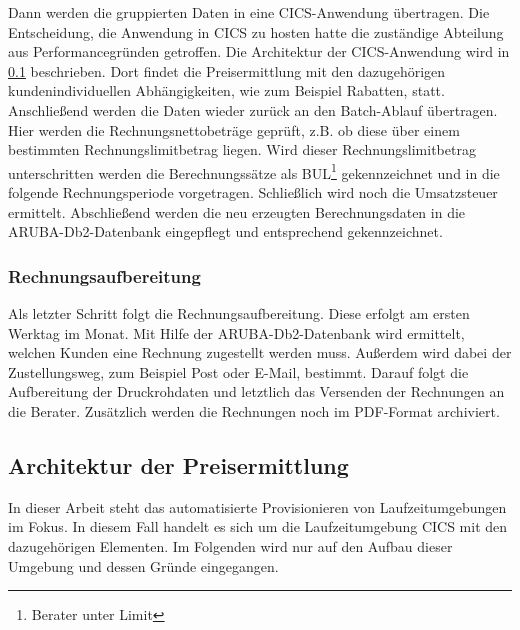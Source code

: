 Dann werden die gruppierten Daten in eine CICS-Anwendung übertragen. Die Entscheidung, die Anwendung in CICS zu hosten hatte die zuständige Abteilung aus Performancegründen getroffen.
Die Architektur der CICS-Anwendung wird in \ref{rechArch} beschrieben.
Dort findet die Preisermittlung mit den dazugehörigen kundenindividuellen Abhängigkeiten, wie zum Beispiel Rabatten, statt.
Anschließend werden die Daten wieder zurück an den Batch-Ablauf übertragen.
Hier werden die Rechnungsnettobeträge geprüft, z.B. ob diese über einem bestimmten Rechnungslimitbetrag liegen.
Wird dieser Rechnungslimitbetrag unterschritten werden die Berechnungssätze als BUL\footnote{Berater unter Limit} gekennzeichnet und in die folgende Rechnungsperiode vorgetragen.
Schließlich wird noch die Umsatzsteuer ermittelt.
Abschließend werden die neu erzeugten Berechnungsdaten in die ARUBA-Db2-Datenbank eingepflegt und entsprechend gekennzeichnet.

\subsubsection{Rechnungsaufbereitung}
Als letzter Schritt folgt die Rechnungsaufbereitung.
Diese erfolgt am ersten Werktag im Monat.
Mit Hilfe der ARUBA-Db2-Datenbank wird ermittelt, welchen Kunden eine Rechnung zugestellt werden muss.
Außerdem wird dabei der Zustellungsweg, zum Beispiel Post oder E-Mail, bestimmt.
Darauf folgt die Aufbereitung der Druckrohdaten und letztlich das Versenden der Rechnungen an die Berater.
Zusätzlich werden die Rechnungen noch im PDF-Format archiviert.

\subsection{Architektur der Preisermittlung}\label{rechArch}
In dieser Arbeit steht das automatisierte Provisionieren von Laufzeitumgebungen im Fokus.
In diesem Fall handelt es sich um die Laufzeitumgebung CICS mit den dazugehörigen Elementen.
Im Folgenden wird nur auf den Aufbau dieser Umgebung und dessen Gründe eingegangen.

